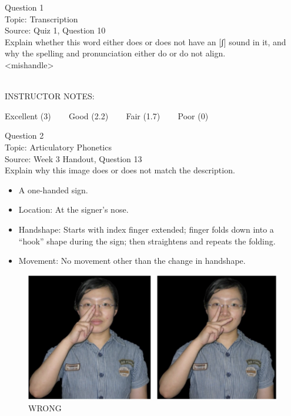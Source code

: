 \documentclass[12pt]{article}
\begin{document}
\begin{center}
\textbf{{\color{blue}{\HUGE START OF EXAM\\}}}

\textbf{{\color{blue}{\HUGE Student ID: 30511\\}}}

\textbf{{\color{blue}{\HUGE \\}}}

\end{center}
\newpage

{\large Question 1}\\

Topic: Transcription\\
Source: Quiz 1, Question 10\\

Explain whether this word either does or does not have an [ʃ] sound in it, and why the spelling and pronunciation either do or do not align.\\

<mishandle>


~\\
INSTRUCTOR NOTES: 


\vfill
Excellent (3) ~~~ Good (2.2) ~~~ Fair (1.7) ~~~ Poor (0)
\newpage

{\large Question 2}\\

Topic: Articulatory Phonetics\\
Source: Week 3 Handout, Question 13\\

Explain why this image does or does not match the description.\\

\begin{itemize} \item A one-handed sign. \item Location: At the signer’s nose. \item Handshape: Starts with index finger extended; finger folds down into a “hook” shape during the sign; then straightens and repeats the folding. \item Movement: No movement other than the change in handshape. \end{itemize}

\begin{figure}[H]
\includegraphics{../images/taiwansign_wrong.png}
\caption{WRONG}
\end{figure}
\end{document}
